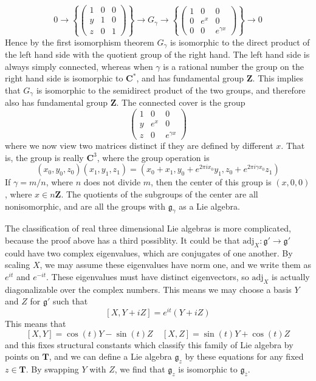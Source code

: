 %
\[ 0 \to \left\{ \begin{pmatrix} 1 & 0 & 0 \\ y & 1 & 0 \\ z & 0 & 1 \end{pmatrix} \right\} \to G_\gamma \to \left\{ \begin{pmatrix} 1 & 0 & 0 \\ 0 & e^x & 0 \\ 0 & 0 & e^{\gamma x} \end{pmatrix} \right\} \to 0 \]
%
Hence by the first isomorphism theorem $G_\gamma$ is isomorphic to the direct product of the left hand side with the quotient group of the right hand. The left hand side is always simply connected, whereas when $\gamma$ is a rational number the group on the right hand side is isomorphic to $\mathbf{C}^*$, and has fundamental group $\mathbf{Z}$. This implies that $G_\gamma$ is isomorphic to the semidirect product of the two groups, and therefore also has fundamental group $\mathbf{Z}$. The connected cover is the group
%
\[ \begin{pmatrix} 1 & 0 & 0 \\ y & e^x & 0 \\ z & 0 & e^{\gamma x} \end{pmatrix} \]
%
where we now view two matrices distinct if they are defined by different $x$. That is, the group is really $\mathbf{C}^3$, where the group operation is
%
\[ (x_0, y_0, z_0)(x_1,y_1,z_1) = (x_0 + x_1 ,y_0 + e^{2 \pi i x_0}y_1, z_0 + e^{2 \pi i \gamma x_0}z_1) \]
%
If $\gamma = m/n$, where $n$ does not divide $m$, then the center of this group is $(x,0,0)$, where $x \in n \mathbf{Z}$. The quotients of the subgroups of the center are all nonisomorphic, and are all the groups with $\mathfrak{g}_\gamma$ as a Lie algebra.

The classification of real three dimensional Lie algebras is more complicated, because the proof above has a third possiblity. It could be that $\text{adj}_X: \mathfrak{g}' \to \mathfrak{g}'$ could have two complex eigenvalues, which are conjugates of one another. By scaling $X$, we may assume these eigenvalues have norm one, and we write them as $e^{it}$ and $e^{-it}$. These eigenvalues must have distinct eigenvectors, so $\text{adj}_X$ is actually diagonalizable over the complex numbers. This means we may choose a basis $Y$ and $Z$ for $\mathfrak{g}'$ such that
%
\[ [X,Y + iZ] = e^{it}(Y + iZ) \]
%
This means that
%
\[ [X,Y] = \cos(t) Y - \sin(t) Z\ \ \ \ \ [X,Z] = \sin(t) Y + \cos(t) Z \]
%
and this fixes structural constants which classify this family of Lie algebra by points on $\mathbf{T}$, and we can define a Lie algebra $\mathfrak{g}_z$ by these equations for any fixed $z \in \mathbf{T}$. By swapping $Y$ with $Z$, we find that $\mathfrak{g}_z$ is isomorphic to $\mathfrak{g}_{\overline{z}}$.

